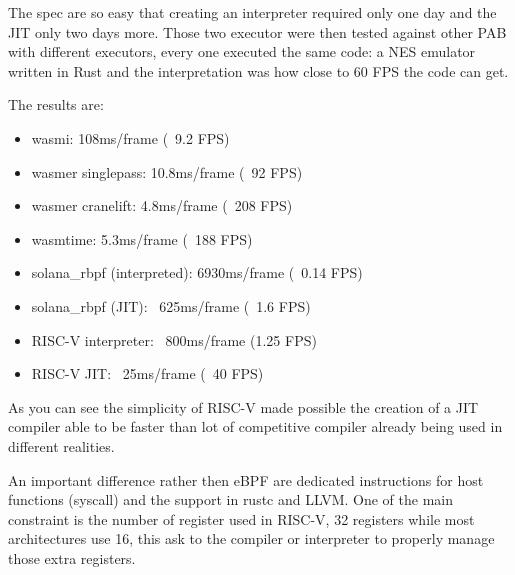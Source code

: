 \documentclass[../main.tex]{subfiles}
\begin{document}
The spec are so easy that creating an interpreter required only one day and the JIT only two days more. Those two executor were then tested against other PAB with different executors, every one executed the same code: a NES emulator written in Rust and the interpretation was how close to 60 FPS the code can get.

The results are:
\begin{itemize}
    \item wasmi: 108ms/frame (~9.2 FPS)
    \item wasmer singlepass: 10.8ms/frame (~92 FPS)
    \item wasmer cranelift: 4.8ms/frame (~208 FPS)
    \item wasmtime: 5.3ms/frame (~188 FPS)
    \item solana\_rbpf (interpreted): 6930ms/frame (~0.14 FPS)
    \item solana\_rbpf (JIT): ~625ms/frame (~1.6 FPS)
    \item RISC-V interpreter: ~800ms/frame (1.25 FPS)
    \item RISC-V JIT: ~25ms/frame (~40 FPS)
\end{itemize}

As you can see the simplicity of RISC-V made possible the creation of a JIT compiler able to be faster than lot of competitive compiler already being used in different realities.

An important difference rather then eBPF are dedicated instructions for host functions (syscall) and the support in rustc and LLVM. One of the main constraint is the number of register used in RISC-V, 32 registers while most architectures use 16, this ask to the compiler or interpreter to properly manage those extra registers.
\end{document}

